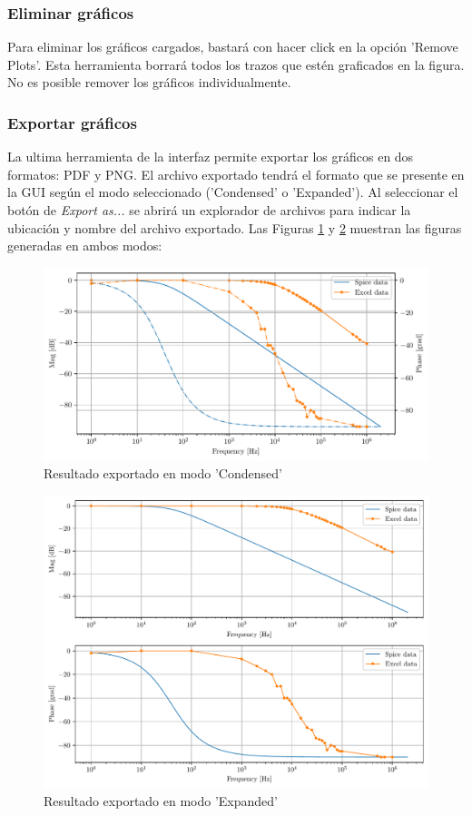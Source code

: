 \subsubsection{Eliminar gráficos}
Para eliminar los gráficos cargados, bastará con hacer click en la opción 'Remove Plots'. Esta herramienta borrará todos los trazos que estén graficados en la figura. No es posible remover los gráficos individualmente.

\subsubsection{Exportar gráficos}
La ultima herramienta de la interfaz permite exportar los gráficos en dos formatos: PDF y PNG. El archivo exportado tendrá el formato que se presente en la GUI según el modo seleccionado ('Condensed' o 'Expanded'). Al seleccionar el botón de \emph{Export as...} se abrirá un explorador de archivos para indicar la ubicación y nombre del archivo exportado. Las Figuras \ref{fig:condExport} y \ref{fig:expExport} muestran las figuras generadas en ambos modos:

\begin{figure}[ht]
\centering
\includegraphics[scale=0.7]{resources/condExport.pdf}
\caption{Resultado exportado en modo 'Condensed'}
\label{fig:condExport}
\end{figure}

\begin{figure}[ht]
\centering
\includegraphics[scale=0.7]{resources/expExport.pdf}
\caption{Resultado exportado en modo 'Expanded'}
\label{fig:expExport}
\end{figure}
